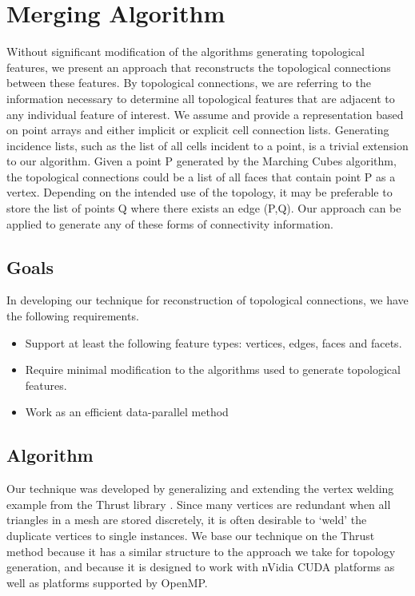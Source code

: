 \documentclass[10pt,journal,cspaper,compsoc]{IEEEtran}
\begin{document}
\section{Merging Algorithm}
Without significant modification of the algorithms generating topological features,
we present an approach that reconstructs the topological connections
between these features. By topological connections, we are referring to the information necessary to
determine all topological features that are adjacent to any individual feature of 
interest. We assume and provide a representation based on point arrays and either implicit or explicit cell connection lists. Generating incidence lists, such as the list of all cells incident to a point, is a trivial extension to our algorithm. Given a point P 
generated by the Marching Cubes algorithm, the topological connections
could be a list of all faces that contain point P as a vertex. Depending on
the intended use of the topology, it may be preferable to store the list of
points Q where there exists an edge (P,Q). Our approach can be applied
to generate any of these forms of connectivity information.

\subsection{Goals}
In developing our technique for reconstruction of topological connections, we have the
following requirements.
\begin{itemize}
	\item{Support at least the following feature types: vertices, edges, faces and facets.}

	\item{Require minimal modification to the algorithms used to generate topological features.}

	\item{Work as an efficient data-parallel method}
 
\end{itemize}

\subsection{Algorithm}
Our technique was developed by generalizing and extending the vertex welding example from the Thrust library \cite{Bell2012}.
Since many vertices are redundant when all triangles in a mesh are stored discretely, it is often desirable to
`weld' the duplicate vertices to single instances. We base our technique on the Thrust method because it has a similar
structure to the approach we take for topology generation, and because it is designed to work with nVidia CUDA platforms as well as platforms supported by OpenMP. 
\end{document}
